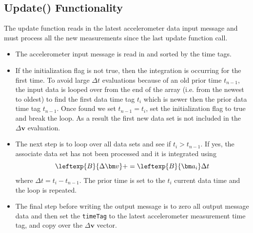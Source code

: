 \subsection{Update() Functionality}
The update function reads in the latest accelerometer data input message and must process all the new measurements since the last update function call.
\begin{itemize}
	\item The accelerometer input message is read in and sorted by the time tags.
	\item If the initialization flag is not true, then the integration is occurring for the first time.  To avoid large $\Delta t$ evaluations because of an old prior time $t_{n-1}$, the input data is looped over from the end of the array (i.e. from the newest to oldest) to find the first data time tag $t_{i}$ which is newer then the prior data time tag $t_{n-1}$.  Once found we set $t_{n-1} = t_{i}$, set the initialization flag to true and break the loop.  As a result the first new data set is not included in the $\Delta\bm v$ evaluation.
	\item The next step is to loop over all data sets and see if $t_{i}>t_{n-1}$.  If yes, the associate data set has not been processed and it is integrated using $$\leftexp{B}{\Delta\bm v} += \leftexp{B}{\bm a_{i}} \Delta t$$ where $\Delta t = t_{i} - t_{n-1}$.  The prior time is set to the $t_{i}$ current data time and the loop is repeated.
	\item The final step before writing the output message is to zero all output message data and then set the {\tt timeTag} to the latest accelerometer measurement time tag, and copy over the $\Delta\bm v$ vector.
\end{itemize}
